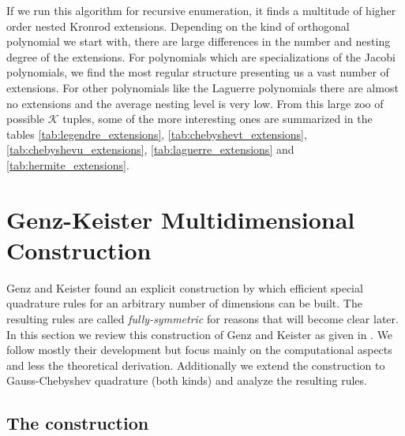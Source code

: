 \documentclass[a4paper,10pt]{article}
\begin{document}
If we run this algorithm for recursive enumeration, it finds a multitude
of higher order nested Kronrod extensions. Depending on the kind of orthogonal
polynomial we start with, there are large differences in the number and nesting
degree of the extensions. For polynomials which are specializations of the
Jacobi polynomials, we find the most regular structure presenting us a vast number
of extensions. For other polynomials like the Laguerre polynomials there are almost
no extensions and the average nesting level is very low. From this large zoo of
possible $\mathcal{K}$ tuples, some of the more interesting ones are summarized
in the tables \ref{tab:legendre_extensions}, \ref{tab:chebyshevt_extensions},
\ref{tab:chebyshevu_extensions}, \ref{tab:laguerre_extensions} and \ref{tab:hermite_extensions}.



\FloatBarrier
\section{Genz-Keister Multidimensional Construction}


Genz and Keister found an explicit construction by which efficient
special quadrature rules for an arbitrary number
of dimensions can be built. The resulting rules are
called \emph{fully-symmetric} for reasons that will become
clear later. In this section we review this construction of Genz
and Keister as given in \cite{genz, genz_keister}. We follow mostly their
development but focus mainly on the computational aspects and less
the theoretical derivation. Additionally we extend the construction
to Gauss-Chebyshev quadrature (both kinds) and analyze the resulting rules.


\subsection{The construction}
\end{document}
